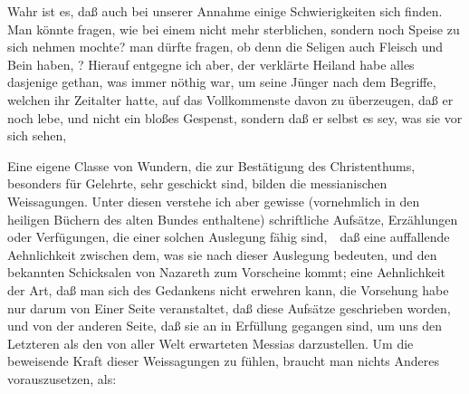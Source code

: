 \begin{aufza}
\begin{aufzb}
\item Wahr ist es, daß auch bei unserer Annahme einige Schwierigkeiten sich finden. Man könnte fragen, wie  bei einem nicht mehr sterblichen, sondern  noch Speise zu sich nehmen mochte? man dürfte fragen, ob denn die Seligen auch Fleisch und Bein haben, \udgl ? Hierauf entgegne ich aber, der verklärte Heiland habe alles dasjenige gethan, was immer nöthig war, um seine Jünger nach dem Begriffe, welchen ihr Zeitalter hatte, auf das Vollkommenste davon zu überzeugen, daß er noch lebe, und nicht ein bloßes Gespenst, sondern daß er selbst es sey, was sie vor sich sehen, \usw\
\end{aufzb}
\end{aufza}

Eine eigene Classe von Wundern, die zur Bestätigung des Christenthums, besonders für Gelehrte, sehr geschickt sind, bilden die messianischen Weissagungen. Unter diesen verstehe ich aber gewisse (vornehmlich in den heiligen Büchern des alten Bundes enthaltene) schriftliche Aufsätze, Erzählungen oder Verfügungen, die einer solchen Auslegung fähig sind,~\ daß eine auffallende Aehnlichkeit zwischen dem, was sie nach dieser Auslegung bedeuten, und den bekannten Schicksalen  von Nazareth zum Vorscheine kommt; eine Aehnlichkeit der Art, daß man sich des Gedankens nicht erwehren kann, die Vorsehung habe nur darum von Einer Seite veranstaltet, daß diese Aufsätze geschrieben worden, und von der anderen Seite, daß sie an  in Erfüllung gegangen sind, um uns den Letzteren als den von aller Welt erwarteten Messias darzustellen. Um die beweisende Kraft dieser Weissagungen zu fühlen, braucht man nichts Anderes vorauszusetzen, als:
